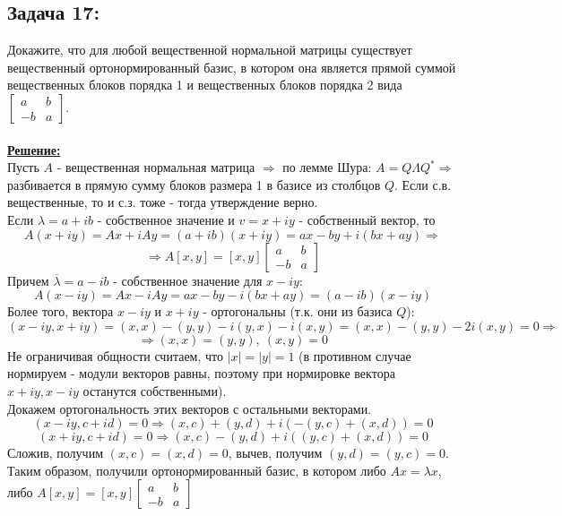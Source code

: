 \documentclass[a4paper,12pt,titlepage,final]{article}
\begin{document}
\subsection*{Задача 17:}
\noindent Докажите, что для любой вещественной нормальной матрицы существует вещественный ортонормированный базис, в котором она является прямой суммой вещественных блоков 
порядка 1 и вещественных блоков порядка 2 вида $\begin{bmatrix} a & b \\ -b & a\end{bmatrix}$.\\ \\
\textbf{\underline{Решение:}} \\
Пусть $A$ - вещественная нормальная матрица $\Rightarrow$ по лемме Шура:
$A = Q\Lambda Q^* \Rightarrow$ разбивается в прямую сумму блоков размера 1 в базисе из столбцов $Q$. Если с.в. вещественные, то и с.з. тоже - тогда утверждение верно. \\
Если $\lambda = a + ib$ - собственное значение и $v = x + iy$ - собственный вектор, то
$$A(x + iy) = Ax + iAy = (a + ib)(x + iy) = ax - by + i(bx + ay) \Rightarrow$$
$$\Rightarrow A[x, y] = [x, y]\begin{bmatrix} a & b \\ -b & a\end{bmatrix}$$
Причем $\overline{\lambda} = a - ib$ - собственное значение для $x - iy$:
$$A(x - iy) = Ax - iAy = ax - by - i(bx + ay) = (a - ib)(x - iy)$$
Более того, вектора $x - iy$ и $x + iy$ - ортогональны (т.к. они из базиса $Q$):
$$(x - iy, x + iy) = (x, x) - (y, y) - i(y, x) - i(x, y) = (x, x) - (y, y) - 2i(x, y) = 0 \Rightarrow$$
$$\Rightarrow (x, x) = (y, y), \: (x, y) = 0$$
Не ограничивая общности считаем, что $|x| = |y| = 1$ (в противном случае нормируем - модули векторов равны, поэтому при нормировке вектора $x + iy, x - iy$ останутся собственными). \\
Докажем ортогональность этих векторов с остальными векторами.
$$(x - iy, c + id) = 0 \Rightarrow (x, c) + (y, d) + i(-(y, c) + (x, d)) = 0$$
$$(x + iy, c + id) = 0 \Rightarrow (x, c) - (y, d) + i((y, c) + (x, d)) = 0$$
Сложив, получим $(x, c) = (x, d) = 0$, вычев, получим $(y, d) = (y, c) = 0$.
Таким образом, получили ортонормированный базис, в котором либо $Ax = \lambda x$,
либо $A[x, y] = [x, y] \begin{bmatrix} a & b \\ -b & a\end{bmatrix}$ \blacksquare \\ \\ \\
\end{document}
